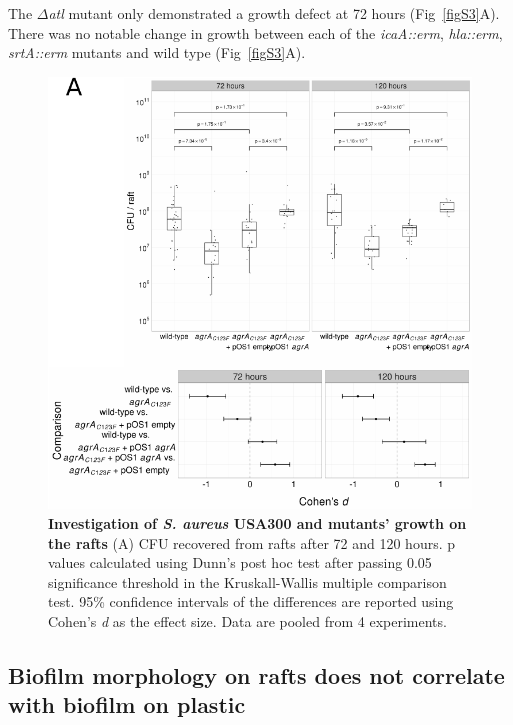 \documentclass[10pt,letterpaper]{article}
\begin{document}
The $\Delta$\textit{atl} mutant only demonstrated a growth defect at 72 hours (Fig~\ref{figS3}A).
There was no notable change in growth between each of the \textit{icaA::erm}, \textit{hla::erm}, \textit{srtA::erm} mutants and wild type (Fig~\ref{figS3}A).


\begin{figure}[!ht]
\begin{adjustwidth}{-2.25in}{0in}
\includegraphics[width=0.85\paperwidth]{Figures/fig3.pdf}
\caption[Investigation of \textit{S. aureus} USA300 and mutants' growth on the rafts]{
	\textbf{Investigation of \textit{S. aureus} USA300 and mutants' growth on the rafts}
	(A) CFU recovered from rafts after 72 and 120 hours. p values calculated using Dunn's post hoc test after passing 0.05 significance threshold in the Kruskall-Wallis multiple comparison test. 95\% confidence intervals of the differences are reported using Cohen's \textit{d} as the effect size. Data are pooled from 4 experiments.}
	\label{fig3}
    \end{adjustwidth}
\end{figure}

\subsection*{Biofilm morphology on rafts does not correlate with biofilm on plastic}
\end{document}

